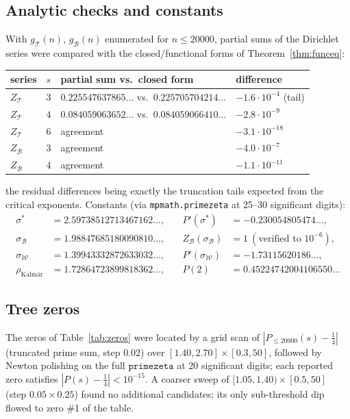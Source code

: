 \documentclass[11pt]{article}
\newcommand{\cT}{\mathcal{T}}   %
\newcommand{\cW}{\mathcal{W}}   %
\newcommand{\cB}{\mathcal{B}}   %
\numberwithin{equation}{section}
\theoremstyle{plain}
\theoremstyle{definition}
\theoremstyle{remark}
\begin{document}
\subsection{Analytic checks and constants}

With $g_\cT(n)$, $g_\cB(n)$ enumerated for $n \le 20000$, partial sums of the Dirichlet
series were compared with the closed/functional forms of Theorem~\ref{thm:funceq}:

\begin{center}\small
\begin{tabular}{@{}llll@{}}
\toprule
series & $s$ & partial sum vs.\ closed form & difference \\
\midrule
$Z_\cT$ & $3$ & $0.225547637865\ldots$ vs.\ $0.225705704214\ldots$ & $-1.6\cdot10^{-4}$ (tail) \\
$Z_\cT$ & $4$ & $0.084059063652\ldots$ vs.\ $0.084059066410\ldots$ & $-2.8\cdot10^{-9}$ \\
$Z_\cT$ & $6$ & agreement & $-3.1\cdot10^{-18}$ \\
$Z_\cB$ & $3$ & agreement & $-4.0\cdot10^{-7}$ \\
$Z_\cB$ & $4$ & agreement & $-1.1\cdot10^{-11}$ \\
\bottomrule
\end{tabular}
\end{center}

\noindent
the residual differences being exactly the truncation tails expected from the critical
exponents. Constants (via \texttt{mpmath.primezeta} at 25--30 significant digits):
\[
\begin{aligned}
\sigma^{*} &= 2.59738512713467162\dots, &\quad P'(\sigma^{*}) &= -0.230054805474\dots,\\
\sigma_\cB &= 1.98847685180090810\dots, &\quad Z_\cB(\sigma_\cB) &= 1\ (\text{verified to } 10^{-6}),\\
\sigma_\cW &= 1.39943332872633032\dots, &\quad P'(\sigma_\cW) &= -1.73115620186\dots,\\
\rho_{\text{Kalm\'ar}} &= 1.72864723899818362\dots, &\quad P(2) &= 0.45224742004106550\dots
\end{aligned}
\]

\subsection{Tree zeros}

The zeros of Table~\ref{tab:zeros} were located by a grid scan of
$|P_{\le 20000}(s) - \tfrac14|$ (truncated prime sum, step $0.02$) over
$[1.40, 2.70] \times [0.3, 50]$, followed by Newton polishing on the full
$\texttt{primezeta}$ at 20 significant digits; each reported zero satisfies
$|P(s) - \tfrac14| < 10^{-15}$. A coarser sweep of $[1.05, 1.40) \times [0.5, 50]$
(step $0.05 \times 0.25$) found no additional candidates; its only sub-threshold dip
flowed to zero \#1 of the table.
\end{document}
